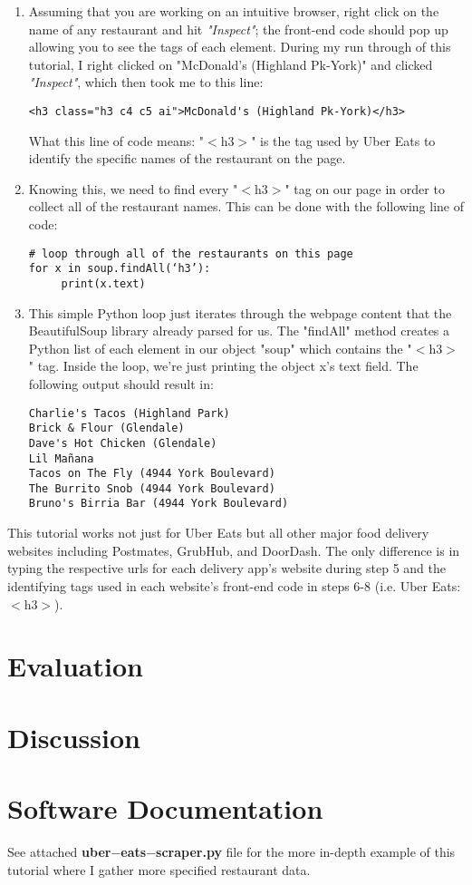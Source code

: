 \documentclass[10pt,twocolumn]{article}
\begin{document}
\begin{enumerate}
    \item Assuming that you are working on an intuitive browser, right click on the name of any restaurant and hit \textit{"Inspect"}; the front-end code should pop up allowing you to see the tags of each element. During my run through of this tutorial, I right clicked on "McDonald's (Highland Pk-York)" and clicked \textit{"Inspect"}, which then took me to this line:

\begin{lstlisting}    
<h3 class="h3 c4 c5 ai">McDonald's (Highland Pk-York)</h3>
\end{lstlisting}  

What this line of code means: "$<$h3$>$" is the tag used by Uber Eats to identify the specific names of the restaurant on the page. 

    \item Knowing this, we need to find every "$<$h3$>$" tag on our page in order to collect all of the restaurant names. This can be done with the following line of code:

\begin{lstlisting}    
# loop through all of the restaurants on this page
for x in soup.findAll(‘h3’): 
     print(x.text)
\end{lstlisting}  

    \item This simple Python loop just iterates through the webpage content that the BeautifulSoup library already parsed for us. The "findAll" method creates a Python list of each element in our object "soup" which contains the "$<$h3$>$" tag. Inside the loop, we're just printing the object x's text field. The following output should result in:

\begin{lstlisting}    
Charlie's Tacos (Highland Park)
Brick & Flour (Glendale)
Dave's Hot Chicken (Glendale)
Lil Mañana
Tacos on The Fly (4944 York Boulevard)
The Burrito Snob (4944 York Boulevard)
Bruno's Birria Bar (4944 York Boulevard)
\end{lstlisting} 

\end{enumerate}

This tutorial works not just for Uber Eats but all other major food delivery websites including Postmates, GrubHub, and DoorDash. The only difference is in typing the respective urls for each delivery app's website during step 5 and the identifying tags used in each website's front-end code in steps 6-8 (i.e. Uber Eats: $<$h3$>$).

\section{Evaluation}


\section{Discussion}

\section{Software Documentation}

See attached \textbf{uber$-$eats$-$scraper.py} file for the more in-depth example of this tutorial where I gather more specified restaurant data.

\printbibliography 
\end{document}
